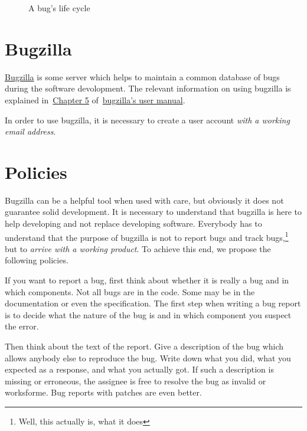 \documentclass[11pt,nologo,handout]{handout}
\begin{document}
\begin{figure}
  \centering
  \caption{A bug's life cycle}
  \label{fig:lifecycle}
\end{figure}






\section{Bugzilla}

\href{http://www.bugzilla.org}{Bugzilla} is some server which helps to
maintain a common database of bugs during the software devolopment.  The
relevant information on using bugzilla is explained
in~\href{http://www.bugzilla.org/docs/2.18/html/using-intro.html}{Chapter 5}
of~\href{http://www.bugzilla.org/docs/2.18/html/}{bugzilla's user manual}.

In order to use bugzilla, it is necessary to create a user account
\emph{with a working email address}.





\section{Policies}

Bugzilla can be a helpful tool when used with care, but obviously it does
not guarantee solid development.  It is necessary to understand that
bugzilla is here to help developing and not replace developing software.
Everybody has to understand that the purpose of bugzilla is not to
report bugs and track bugs,\footnote{Well, this actually is, what it does}
but to \emph{arrive with a working product}.  To achieve this end, we
propose the following policies.

If you want to report a bug, first think about whether it is really a
bug and in which components.  Not all bugs are in the code.  Some may
be in the documentation or even the specification.  The first step when
writing a bug report is to decide what the nature of the bug is and in
which component you suspect the error.

Then think about the text of the report.  Give a description of the bug
which allows anybody else to reproduce the bug.  Write down what you did,
what you expected as a response, and what you actually got.  If such a
description is missing or erroneous, the assignee is free to resolve
the bug as invalid or worksforme.  Bug reports with patches are even
better.
\end{document}
